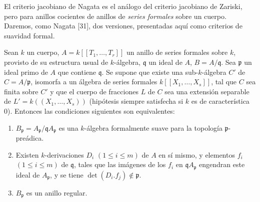 \begin{env}[22.7.1]
\label{0.22.7.1-fr}
El criterio jacobiano de Nagata es el análogo del criterio jacobiano de Zariski,
pero para anillos cocientes de anillos de \emph{series formales} sobre un
cuerpo. Daremos, como Nagata [31], dos versiones, presentadas aquí
como criterios de suavidad formal.
\end{env}

\begin{proposition}[22.7.2]
\label{0.22.7.2-fr}
Sean $k$ un cuerpo, $A=k[[T_1,\ldots,T_r]]$ un anillo de series formales sobre
$k$, provisto de su estructura usual de $k$-álgebra, $\mathfrak q$ un ideal de
$A$, $B=A/\mathfrak q$. Sea $\mathfrak p$ un ideal primo de $A$ que contiene
$\mathfrak q$. Se supone que existe una sub-$k$-álgebra $C'$ de
$C=A/\mathfrak p$, isomorfa a un álgebra de series formales
$k[[X_1,\ldots,X_s]]$, tal que $C$ sea finita sobre $C'$ y que el cuerpo de
fracciones $L$ de $C$ sea una extensión separable de
$L'=k((X_1,\ldots,X_s))$ \textup{(hipótesis siempre satisfecha si $k$ es de
característica 0)}. Entonces las condiciones siguientes son equivalentes:
\begin{enumerate}
  \item[\textup{a)}] $B_{\mathfrak p}=A_{\mathfrak p}/\mathfrak qA_{\mathfrak p}$ es
  una $k$-álgebra formalmente suave para la topología
  $\mathfrak p$-preádica.
  \item[\textup{b)}] Existen $k$-derivaciones $D_i$ $(1\leq i\leq m)$ de $A$ en
  sí mismo, y elementos $f_i$ $(1\leq i\leq m)$ de $\mathfrak q$, tales
  que las imágenes de los $f_i$ en $\mathfrak qA_{\mathfrak p}$ engendran este
  ideal de $A_{\mathfrak p}$, y se tiene
  $\det(D_i.f_j)\notin\mathfrak p$.
  \item[\textup{c)}] $B_{\mathfrak p}$ es un anillo regular.
\end{enumerate}
\end{proposition}

